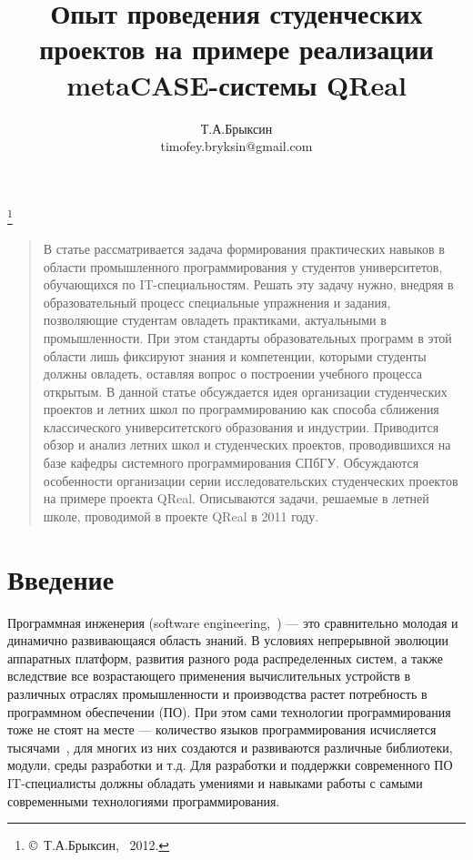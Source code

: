 \documentclass[a4paper]{article}
\title{Опыт проведения студенческих проектов на примере реализации metaCASE-системы QReal}
\author{Т.А.Брыксин \\ timofey.bryksin@gmail.com}
\date{}
\begin{document}
\maketitle
\thispagestyle{empty}

\renewcommand{\thefootnote}{}
\footnote{\small{\copyright~Т.А.Брыксин, ~2012.}}
\renewcommand{\thefootnote}{\arabic{footnote}}
\setcounter{footnote}{0}

\begin{quote}
\small\noindent
В статье рассматривается задача формирования практических навыков в области промышленного программирования у студентов университетов, обучающихся по IT-специальностям. Решать эту задачу нужно, внедряя в образовательный процесс специальные упражнения и задания, позволяющие студентам овладеть практиками, актуальными в промышленности. При этом стандарты образовательных программ в этой области лишь фиксируют знания и компетенции, которыми студенты должны овладеть, оставляя вопрос о построении учебного процесса открытым. В данной статье обсуждается идея организации студенческих проектов и летних школ по программированию как способа сближения классического университетского образования и индустрии. Приводится обзор и анализ летних школ и студенческих проектов, проводившихся на базе кафедры системного программирования СПбГУ. Обсуждаются особенности организации серии исследовательских студенческих проектов на примере проекта QReal. Описываются задачи, решаемые в летней школе, проводимой в проекте QReal в 2011 году. 
\end{quote}

\section*{Введение} 
Программная инженерия (software engineering,~\cite{terekhov1, swebok}) --- это сравнительно молодая и динамично развивающаяся область знаний. В условиях непрерывной эволюции аппаратных платформ, развития разного рода распределенных систем, а также вследствие все возрастающего применения вычислительных устройств в различных отраслях промышленности и производства растет потребность в программном обеспечении (ПО).  При этом сами технологии программирования тоже не стоят на месте --- количество языков программирования исчисляется тысячами~\cite{langList}, для многих из них создаются и развиваются различные библиотеки, модули, среды разработки и т.д. Для разработки и поддержки современного ПО IT-специалисты должны обладать умениями и навыками работы с самыми современными технологиями программирования. 
 
\end{document}
